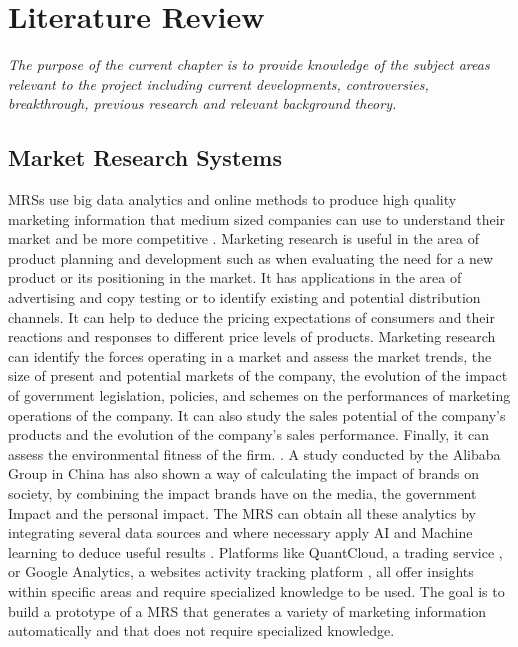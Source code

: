 \chapter{Literature Review}

\textsl{The purpose of the current chapter is to provide knowledge of the subject areas relevant to the project including current developments, controversies, breakthrough, previous research and relevant background theory.}


\section{Market Research Systems}
\ac{MRS}s use big data analytics and online methods to produce high quality marketing information that medium sized companies can use to understand their market and be more competitive \cite{digitaltrasformationsmes}. Marketing research is useful in the area of product planning and development such as when evaluating the need for a new product or its positioning in the market. It has applications in the area of advertising and copy testing or to identify existing and potential distribution channels. It can help to deduce the pricing expectations of consumers and their reactions and responses to different price levels of products. Marketing research can identify the forces operating in a market and assess the market trends, the size of present and potential markets of the company, the evolution of the impact of government legislation, policies, and schemes on the performances of marketing operations of the company. It can also study the sales potential of the company’s products and the evolution of the company’s sales performance. Finally, it can assess the environmental fitness of the firm. \cite{marketingresearch}. A study conducted by the Alibaba Group in China has also shown a way of calculating the impact of brands on society, by combining the impact brands have on the media, the government Impact and the personal impact. \cite{brandsimpact} The \ac{MRS} can obtain all these analytics by integrating several data sources and where necessary apply AI and Machine learning to deduce useful results \cite{marketingml}. Platforms like QuantCloud, a trading service \cite{quantcloud}, or Google Analytics, a websites activity tracking platform \cite{googleanalytics}, all offer insights within specific areas and require specialized knowledge to be used. The goal is to build a prototype of a \ac{MRS} that generates a variety of marketing information automatically and that does not require specialized knowledge.



